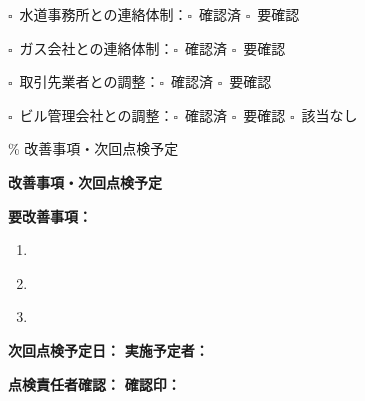 \documentclass[
  japanese,
]{jarticle}
\newcommand{\checkbox}{$\square$\ }
\newcommand{\underlinespace}[1]{\underline{\hspace{#1}}}
\begin{document}
\checkbox 水道事務所との連絡体制：\checkbox 確認済 \checkbox 要確認

\checkbox ガス会社との連絡体制：\checkbox 確認済 \checkbox 要確認

\checkbox 取引先業者との調整：\checkbox 確認済 \checkbox 要確認

\checkbox ビル管理会社との調整：\checkbox 確認済 \checkbox 要確認
\checkbox 該当なし

\% 改善事項・次回点検予定

\textbf{\large 改善事項・次回点検予定}

\textbf{要改善事項：}

\begin{enumerate}
\def\labelenumi{\arabic{enumi}.}
\item
  \underlinespace{12cm}
\item
  \underlinespace{12cm}
\item
  \underlinespace{12cm}
\end{enumerate}

\textbf{次回点検予定日：} \underlinespace{4cm} \textbf{実施予定者：}
\underlinespace{4cm}

\textbf{点検責任者確認：} \underlinespace{4cm} \textbf{確認印：}
\underlinespace{3cm}
\end{document}
